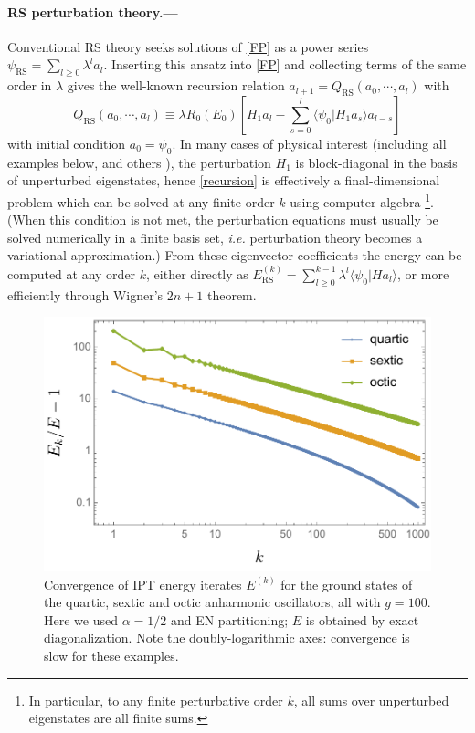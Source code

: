 \documentclass[aps,prl,reprint]{revtex4-2}
\begin{document}
	\paragraph{RS perturbation theory.---}
    Conventional RS theory seeks solutions of \eqref{FP} as a power series $\psi_\textrm{RS}=\sum_{l\geq 0}\lambda^l a_l$. Inserting this ansatz into \eqref{FP} and collecting terms of the same order in $\lambda$ gives the well-known recursion relation $a_{l+1}=Q_\textrm{RS}(a_0, \cdots , a_l)$ with
	\begin{equation}\label{recursion}
	 Q_\textrm{RS}(a_0, \cdots , a_l)\equiv \lambda R_0(E_0)[H_1  a_{l} - \sum_{s=0}^{l}\langle \psi_0\vert H_1  a_s\rangle a_{l-s}]
	\end{equation}
    with initial condition $a_0=\psi_0$. In many cases of physical interest (including all examples below, and others \cite{adamsAlgebraicApproachSimple1994}), the perturbation $H_1$ is block-diagonal in the basis of unperturbed eigenstates, hence \eqref{recursion} is effectively a final-dimensional problem which can be solved at any finite order $k$ using computer algebra \footnote{In particular, to any finite perturbative order $k$, all sums over unperturbed eigenstates are all finite sums.}. (When this condition is not met, the perturbation equations must usually be solved numerically in a finite basis set, \emph{i.e.} perturbation theory becomes a variational approximation.) From these eigenvector coefficients the energy can be computed at any order $k$, either directly as $E^{(k)}_\textrm{RS}=\sum_{l\geq 0}^{k-1}\lambda^l\langle \psi_0\vert H a_l\rangle$, or more efficiently through Wigner's $2n+1$ theorem.

        	    \begin{figure}[t!]
		\hspace*{-1.1cm}
		\includegraphics[width = \columnwidth]{anharmonic.pdf}
		\caption{Convergence of IPT energy iterates $E^{(k)}$ for the ground states of the quartic, sextic and octic anharmonic oscillators, all with $g=100$. Here we used $\alpha = 1/2$ and EN partitioning; $E$ is obtained by exact diagonalization. Note the doubly-logarithmic axes: convergence is slow for these examples.
		}
		\label{fig:anharmonic}
		\end{figure}
\end{document}
